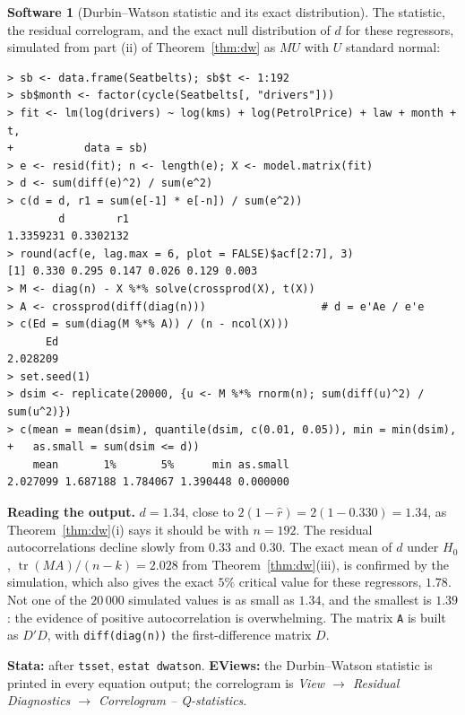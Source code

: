 \documentclass[11pt,a4paper]{article}
\numberwithin{equation}{section}
\DeclareMathOperator{\tr}{tr}
\theoremstyle{definition}
\newtheorem{software}[thm]{Software}
\begin{document}
\begin{software}[Durbin--Watson statistic and its exact distribution]
\label{sw:actests}
The statistic, the residual correlogram, and the exact null distribution of $d$ for these regressors, simulated from part (ii) of
Theorem~\ref{thm:dw} as $MU$ with $U$ standard normal:
{\small\begin{verbatim}
> sb <- data.frame(Seatbelts); sb$t <- 1:192
> sb$month <- factor(cycle(Seatbelts[, "drivers"]))
> fit <- lm(log(drivers) ~ log(kms) + log(PetrolPrice) + law + month + t,
+           data = sb)
> e <- resid(fit); n <- length(e); X <- model.matrix(fit)
> d <- sum(diff(e)^2) / sum(e^2)
> c(d = d, r1 = sum(e[-1] * e[-n]) / sum(e^2))
        d        r1 
1.3359231 0.3302132 
> round(acf(e, lag.max = 6, plot = FALSE)$acf[2:7], 3)
[1] 0.330 0.295 0.147 0.026 0.129 0.003
> M <- diag(n) - X %*% solve(crossprod(X), t(X))
> A <- crossprod(diff(diag(n)))                  # d = e'Ae / e'e
> c(Ed = sum(diag(M %*% A)) / (n - ncol(X)))
      Ed 
2.028209 
> set.seed(1)
> dsim <- replicate(20000, {u <- M %*% rnorm(n); sum(diff(u)^2) / sum(u^2)})
> c(mean = mean(dsim), quantile(dsim, c(0.01, 0.05)), min = min(dsim),
+   as.small = sum(dsim <= d))
    mean       1%       5%      min as.small 
2.027099 1.687188 1.784067 1.390448 0.000000 
\end{verbatim}}
\textbf{Reading the output.} $d = 1.34$, close to $2(1 - \hat r) = 2(1 - 0.330) = 1.34$, as Theorem~\ref{thm:dw}(i) says it should be with $n = 192$. The
residual autocorrelations decline slowly from $0.33$ and $0.30$. The exact mean of $d$ under $H_0$, $\tr(MA)/(n - k) = 2.028$ from Theorem~\ref{thm:dw}(iii), is
confirmed by the simulation, which also gives the exact $5\%$ critical value for these regressors, $1.78$. Not one of the $20\,000$ simulated values is as
small as $1.34$, and the smallest is $1.39$: the evidence of positive autocorrelation is overwhelming. The matrix \texttt{A} is built as
$D'D$, with \texttt{diff(diag(n))} the first-difference matrix $D$.

\textbf{Stata:} after \texttt{tsset}, \texttt{estat dwatson}. \textbf{EViews:} the Durbin--Watson statistic is printed in every equation output; the
correlogram is \emph{View $\to$ Residual Diagnostics $\to$ Correlogram -- Q-statistics}.
\end{software}
\end{document}
